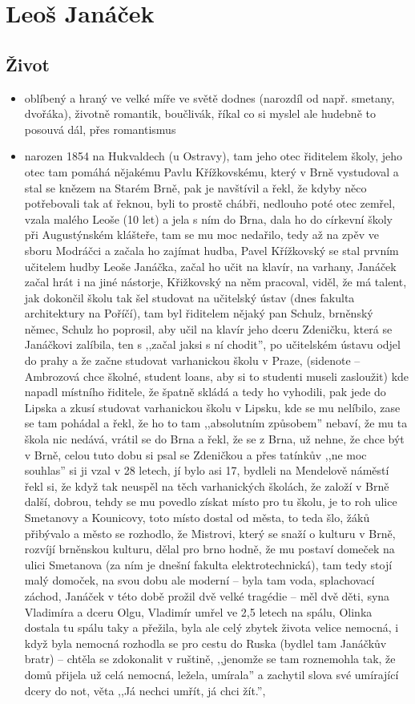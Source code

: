 \documentclass{article}
\begin{document}
\section{Leoš Janáček}

\subsection{Život}
\begin{itemize}
  \item oblíbený a hraný ve velké míře ve světě dodnes (narozdíl od např. smetany, dvořáka), životně romantik, boučlivák, říkal co si myslel ale hudebně to posouvá dál, přes romantismus
  \item narozen 1854 na Hukvaldech (u Ostravy), tam jeho otec řiditelem školy, jeho otec tam pomáhá nějakému Pavlu Křížkovskému, který v Brně vystudoval a stal se knězem na Starém Brně, pak je navštívil a řekl, že kdyby něco potřebovali tak ať řeknou, byli to prostě chábři, nedlouho poté otec zemřel, vzala malého Leoše (10 let) a jela s ním do Brna, dala ho do církevní školy při Augustýnském klášteře, tam se mu moc nedařilo, tedy až na zpěv ve sboru Modráčci a začala ho zajímat hudba, Pavel Křížkovský se stal prvním učitelem hudby Leoše Janáčka, začal ho učit na klavír, na varhany, Janáček začal hrát i na jiné nástorje, Křižkovský na něm pracoval, viděl, že má talent, jak dokončil školu tak šel studovat na učitelský ústav (dnes fakulta architektury na Poříčí), tam byl řiditelem nějaký pan Schulz, brněnský němec, Schulz ho poprosil, aby učil na klavír jeho dceru Zdeničku, která se Janáčkovi zalíbila, ten s ,,začal jaksi s ní chodit”, po učitelském ústavu odjel do prahy a že začne studovat varhanickou školu v Praze, (sidenote -- Ambrozová chce školné, student loans, aby si to studenti museli zasloužit) kde napadl místního řiditele, že špatně skládá a tedy ho vyhodili, pak jede do Lipska a zkusí studovat varhanickou školu v Lipsku, kde se mu nelíbilo, zase se tam pohádal a řekl, že ho to tam ,,absolutním způsobem” nebaví, že mu ta škola nic nedává, vrátil se do Brna a řekl, že se z Brna, už nehne, že chce být v Brně, celou tuto dobu si psal se Zdeničkou a přes tatínkův ,,ne moc souhlas” si ji vzal v 28 letech, jí bylo asi 17, bydleli na Mendelově náměstí  řekl si, že když tak neuspěl na těch varhanických školách, že založí v Brně další, dobrou, tehdy se mu povedlo získat místo pro tu školu, je to roh ulice Smetanovy a Kounicovy, toto místo dostal od města, to teda šlo, žáků přibývalo a město se rozhodlo, že Mistrovi, který se snaží o kulturu v Brně, rozvíjí brněnskou kulturu, dělal pro brno hodně, že mu postaví domeček na ulici Smetanova (za ním je dnešní fakulta elektrotechnická), tam tedy stojí malý domoček, na svou dobu ale moderní -- byla tam voda, splachovací záchod, Janáček v této době prožil dvě velké tragédie -- měl dvě děti, syna Vladimíra a dceru Olgu, Vladimír umřel ve 2,5 letech na spálu, Olinka dostala tu spálu taky a přežila, byla ale celý zbytek života velice nemocná, i když byla nemocná rozhodla se pro cestu do Ruska (bydlel tam Janáčkův bratr) -- chtěla se zdokonalit v ruštině, ,,jenomže se tam roznemohla tak, že domů přijela už celá nemocná, ležela, umírala” a zachytil slova své umírající dcery do not, věta ,,Já nechci umřít, já chci žít.”, 
\end{itemize}
\end{document}
